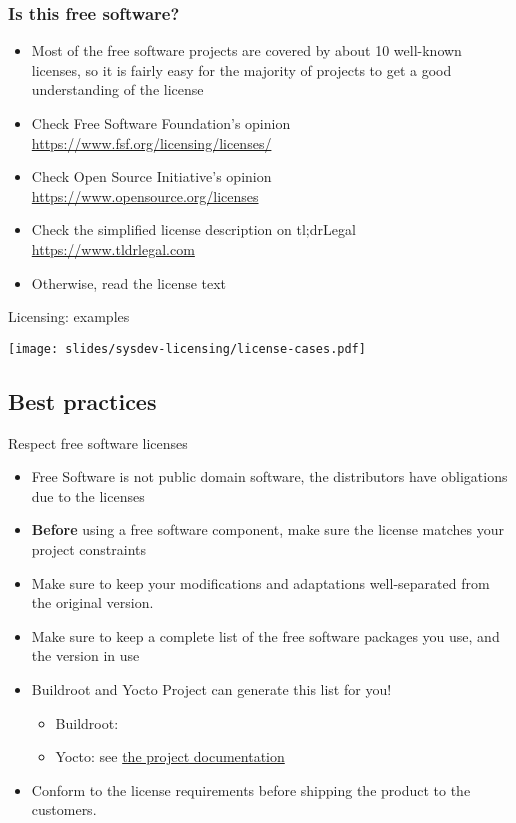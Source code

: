 \begin{frame}
  \frametitle{Is this free software?}
  \begin{itemize}
  \item Most of the free software projects are covered by about 10
    well-known licenses, so it is fairly easy for the majority of
    projects to get a good understanding of the license
  \item Check Free Software Foundation's opinion\\
    \url{https://www.fsf.org/licensing/licenses/}
  \item Check Open Source Initiative's opinion\\
    \url{https://www.opensource.org/licenses}
  \item Check the simplified license description on tl;drLegal\\
    \url{https://www.tldrlegal.com}
  \item Otherwise, read the license text
  \end{itemize}
\end{frame}

\begin{frame}{Licensing: examples}
  \begin{center}
    \texttt{[image: slides/sysdev-licensing/license-cases.pdf]}
  \end{center}
\end{frame}

\subsection{Best practices}

\begin{frame}{Respect free software licenses}
  \begin{itemize}
  \item Free Software is not public domain software, the distributors
    have obligations due to the licenses
  \item {\bf Before} using a free software component, make sure the
    license matches your project constraints
  \item Make sure to keep your modifications and adaptations
    well-separated from the original version.
  \item Make sure to keep a complete list of the free software
    packages you use, and the version in use
  \item Buildroot and Yocto Project can generate this list for you!
    \begin{itemize}
    \item Buildroot: 
    \item Yocto: see
      \href{https://docs.yoctoproject.org/dev-manual/licenses.html\#maintaining-open-source-license-compliance-during-your-product-s-lifecycle}{the
        project documentation}
    \end{itemize}
  \item Conform to the license requirements before shipping the
    product to the customers.
  \end{itemize}
\end{frame}

